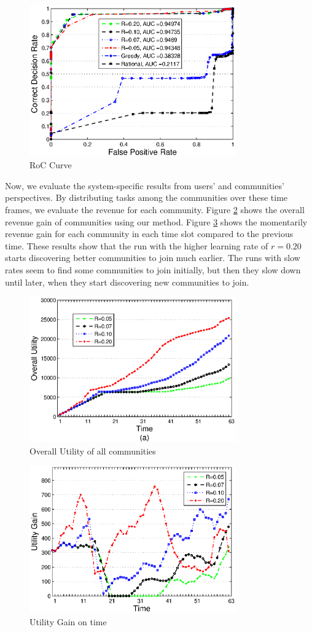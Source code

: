 \documentclass[10pt,journal,cspaper,compsoc]{IEEEtran}
\begin{document}
\begin{figure}%
\centering
\includegraphics[width=3.5in]{figures/roc.eps}
\caption{RoC Curve}
\label{roc5}
\end{figure}
Now, we evaluate the system-specific results from users' and communities' perspectives. By distributing tasks among the communities over these time frames, we evaluate the revenue for each community. Figure \ref{stats1} shows the overall revenue gain of communities using our method. Figure \ref{stats2} shows the momentarily revenue gain for each community in each time slot compared to the previous time. These results show that the run with the higher learning rate of $r=0.20$ starts discovering better communities to join much earlier. The runs with slow rates seem to find some communities to join initially, but then they slow down until later, when they start discovering new communities to join.

\begin{figure}%
\centering
\includegraphics[width=3.5in]{figures/stats1.eps}
\caption{Overall Utility of all communities}
\label{stats1}
\end{figure}


\begin{figure}%
\centering
\includegraphics[width=3.5in]{figures/stats2.eps}
\caption{Utility Gain on time}
\label{stats2}
\end{figure}
\end{document}
